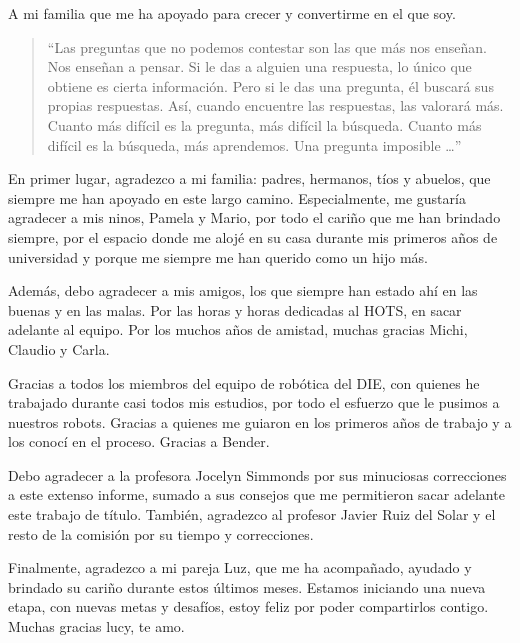 \begin{dedicatoria}
A mi familia que me ha apoyado para crecer y convertirme en el que soy.
\vspace{50pt}
\begin{quote}
	``Las preguntas que no podemos contestar son las que más nos enseñan. Nos enseñan a pensar. Si le das a alguien una respuesta, lo único que obtiene es cierta información. Pero si le das una pregunta, él buscará sus propias respuestas. Así, cuando encuentre las respuestas, las valorará más. Cuanto más difícil es la pregunta, más difícil la búsqueda. Cuanto más difícil es la búsqueda, más aprendemos. Una pregunta imposible \ldots''
\end{quote}

\end{dedicatoria}

\begin{thanks}

En primer lugar, agradezco a mi familia: padres, hermanos, tíos y abuelos, que siempre me han apoyado en este largo camino. Especialmente, me gustaría agradecer a mis ninos, Pamela y Mario, por todo el cariño que me han brindado siempre, por el espacio donde me alojé en su casa durante mis primeros años de universidad y porque me siempre me han querido como un hijo más.

Además, debo agradecer a mis amigos, los que siempre han estado ahí en las buenas y en las malas. Por las horas y horas dedicadas al HOTS, en sacar adelante al equipo. Por los muchos años de amistad, muchas gracias Michi, Claudio y Carla.

Gracias a todos los miembros del equipo de robótica del DIE,  con quienes he trabajado durante casi todos mis estudios, por todo el esfuerzo que le pusimos a nuestros robots. Gracias a quienes me guiaron en los primeros años de trabajo y a los conocí en el proceso. Gracias a Bender.

Debo agradecer a la profesora Jocelyn Simmonds por sus minuciosas correcciones a este extenso informe, sumado a sus consejos que me permitieron sacar adelante este trabajo de título. También, agradezco al profesor Javier Ruiz del Solar y el resto de la comisión por su tiempo y correcciones.

Finalmente, agradezco a mi pareja Luz, que me ha acompañado, ayudado y brindado su cariño durante estos últimos meses. Estamos iniciando una nueva etapa, con nuevas metas y desafíos, estoy feliz por poder compartirlos contigo. Muchas gracias lucy, te amo.

\end{thanks}
